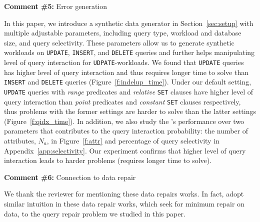 \comskip

\noindent
\textbf{Comment \#5:} Error generation
\begin{quote}
\end{quote}

In this paper, we introduce a synthetic data generator in Section~\ref{sec:setup}
with multiple adjustable parameters, including query type, workload and
database size, and query selectivity.  These parameters allow us to generate 
synthetic workloads on \texttt{UPDATE}, \texttt{INSERT}, and \texttt{DELETE} queries and
further helps manipulating level of query interaction for \texttt{UDPATE}-workloads. 
We found that \texttt{UPDATE} queries has higher level of query interaction and thus
requires longer time to solve than \texttt{INSERT} and \texttt{DELETE} queries 
(Figure~\ref{f:indelup_time}). Under our default setting, \texttt{UPDATE} queries with 
\textit{range} predicates and \textit{relative} \texttt{SET} clauses have higher level of query
 interaction than \textit{point} predicates and \textit{constant} 
\texttt{SET} clauses respectively, thus problems with the former settings are 
harder to solve than the latter settings (Figure~\ref{f:qidx_time}). 
In addition, we also study the \sys's performance over two parameters that 
contributes to the query interaction probability: the number of attributes, $N_a$, in 
Figure~\ref{f:attr} and percentage of query selectivity in Appendix~\ref{app:selectivity}.
Our experiment confirms that higher level of query interaction leads to 
harder problems (requires longer time to solve). 



\comskip

\noindent
\textbf{Comment \#6:} Connection to data repair
\begin{quote}
\end{quote}

We thank the reviewer for mentioning these data repairs works. In fact, 
\sys adopt similar intuition in these data repair works, 
which seek for minimum repair on data, 
to the query repair problem we studied in this paper. 

 
